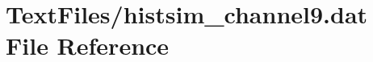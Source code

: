 \hypertarget{TextFiles_2histsim__channel9_8dat}{}\section{Text\+Files/histsim\+\_\+channel9.dat File Reference}
\label{TextFiles_2histsim__channel9_8dat}
